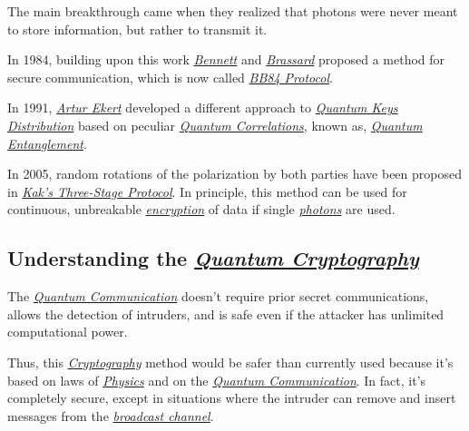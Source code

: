 \documentclass[conference]{IEEEtran}
\begin{document}
The main breakthrough came when they realized that photons were never meant to store information, but rather to transmit it.

\vspace{4pt}

In 1984, building upon this work \href{https://en.wikipedia.org/wiki/Charles_H._Bennett_(computer_scientist)}{\textit{Bennett}} and \href{https://en.wikipedia.org/wiki/Gilles_Brassard}{\textit{Brassard}} proposed a method for secure communication, which is now called \href{https://en.wikipedia.org/wiki/BB84}{\textit{BB84 Protocol}}.

\vspace{4pt}

In 1991, \href{https://en.wikipedia.org/wiki/Artur_Ekert}{\textit{Artur Ekert}} developed a different approach to \href{https://en.wikipedia.org/wiki/Quantum_key_distribution}{\textit{Quantum Keys Distribution}} based on peculiar \href{https://en.wikipedia.org/wiki/Quantum_correlation}{\textit{Quantum Correlations}}, known as, \href{https://en.wikipedia.org/wiki/Quantum_entanglement}{\textit{Quantum Entanglement}}.

\vspace{4pt}

In 2005, random rotations of the polarization by both parties have been proposed in \href{https://en.wikipedia.org/wiki/Subhash_Kak}{\textit{Kak's Three-Stage Protocol}}. In principle, this method can be used for continuous, unbreakable \href{https://en.wikipedia.org/wiki/Encryption}{\textit{encryption}} of data if single \href{https://en.wikipedia.org/wiki/Photon}{\textit{photons}} are used.

\vspace{6pt}

\subsection{Understanding the \href{https://en.wikipedia.org/wiki/Quantum_cryptography}{\textit{Quantum Cryptography}}}\label{A4}

The \href{https://en.wikipedia.org/wiki/Quantum_information_science}{\textit{Quantum Communication}} doesn't require prior secret communications, allows the detection of intruders, and is safe even if the attacker has unlimited computational power.

\vspace{4pt}

Thus, this \href{https://en.wikipedia.org/wiki/Cryptography}{\textit{Cryptography}} method would be safer than currently used because it's based on laws of \href{https://en.wikipedia.org/wiki/Physics}{\textit{Physics}} and on the \href{https://en.wikipedia.org/wiki/Quantum_information_science}{\textit{Quantum Communication}}. In fact, it's completely secure, except in situations where the intruder can remove and insert messages from the \href{https://en.wikipedia.org/wiki/Broadcasting}{\textit{broadcast channel}}.
\end{document}
